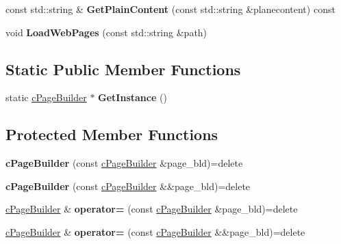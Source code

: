 \begin{DoxyCompactItemize}
\item 
\hypertarget{classhttp__server_1_1cPageBuilder_a796f41711bd67b135dd74b8843b4c129}{const std\-::string \& {\bfseries Get\-Plain\-Content} (const std\-::string \&planecontent) const }\label{classhttp__server_1_1cPageBuilder_a796f41711bd67b135dd74b8843b4c129}

\item 
\hypertarget{classhttp__server_1_1cPageBuilder_abb66a90713d1978c67dd1dd50bc08278}{void {\bfseries Load\-Web\-Pages} (const std\-::string \&path)}\label{classhttp__server_1_1cPageBuilder_abb66a90713d1978c67dd1dd50bc08278}

\end{DoxyCompactItemize}
\subsection*{Static Public Member Functions}
\begin{DoxyCompactItemize}
\item 
\hypertarget{classhttp__server_1_1cPageBuilder_acf7940105f1b4f5d77a0cecac9a69db6}{static \hyperlink{classhttp__server_1_1cPageBuilder}{c\-Page\-Builder} $\ast$ {\bfseries Get\-Instance} ()}\label{classhttp__server_1_1cPageBuilder_acf7940105f1b4f5d77a0cecac9a69db6}

\end{DoxyCompactItemize}
\subsection*{Protected Member Functions}
\begin{DoxyCompactItemize}
\item 
\hypertarget{classhttp__server_1_1cPageBuilder_ab4ac2d8b0bc9d897a9ce6cb472ab43a6}{{\bfseries c\-Page\-Builder} (const \hyperlink{classhttp__server_1_1cPageBuilder}{c\-Page\-Builder} \&page\-\_\-bld)=delete}\label{classhttp__server_1_1cPageBuilder_ab4ac2d8b0bc9d897a9ce6cb472ab43a6}

\item 
\hypertarget{classhttp__server_1_1cPageBuilder_a4e08320edbf9a17ca7cb89cec7fbbf4b}{{\bfseries c\-Page\-Builder} (const \hyperlink{classhttp__server_1_1cPageBuilder}{c\-Page\-Builder} \&\&page\-\_\-bld)=delete}\label{classhttp__server_1_1cPageBuilder_a4e08320edbf9a17ca7cb89cec7fbbf4b}

\item 
\hypertarget{classhttp__server_1_1cPageBuilder_abc7587c1b621f93c04454e4a4bb3d47f}{\hyperlink{classhttp__server_1_1cPageBuilder}{c\-Page\-Builder} \& {\bfseries operator=} (const \hyperlink{classhttp__server_1_1cPageBuilder}{c\-Page\-Builder} \&page\-\_\-bld)=delete}\label{classhttp__server_1_1cPageBuilder_abc7587c1b621f93c04454e4a4bb3d47f}

\item 
\hypertarget{classhttp__server_1_1cPageBuilder_a3aca39fa70e6a638a0486a1cf8dae84b}{\hyperlink{classhttp__server_1_1cPageBuilder}{c\-Page\-Builder} \& {\bfseries operator=} (const \hyperlink{classhttp__server_1_1cPageBuilder}{c\-Page\-Builder} \&\&page\-\_\-bld)=delete}\label{classhttp__server_1_1cPageBuilder_a3aca39fa70e6a638a0486a1cf8dae84b}

\end{DoxyCompactItemize}
